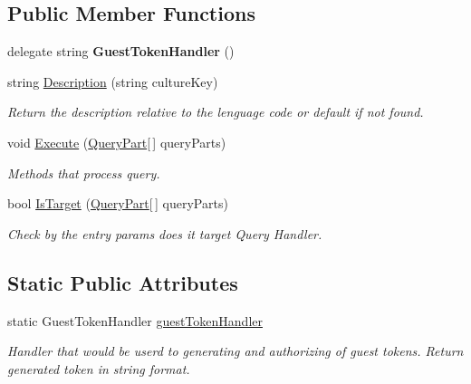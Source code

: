 \subsection*{Public Member Functions}
\begin{DoxyCompactItemize}
\item 
\mbox{\label{class_base_queries_1_1_g_e_t___g_u_e_s_t___t_o_k_e_n_a14602bc19c65ba7d11abf85e5e0f74a6}} 
delegate string {\bfseries Guest\+Token\+Handler} ()
\item 
string \mbox{\hyperlink{class_base_queries_1_1_g_e_t___g_u_e_s_t___t_o_k_e_n_a06d62fabd5b44fb6b9975da1b72308a2}{Description}} (string culture\+Key)
\begin{DoxyCompactList}\small\item\em Return the description relative to the lenguage code or default if not found. \end{DoxyCompactList}\item 
void \mbox{\hyperlink{class_base_queries_1_1_g_e_t___g_u_e_s_t___t_o_k_e_n_afbad0ace27a743793bccea51a5c39db5}{Execute}} (\mbox{\hyperlink{struct_uniform_queries_1_1_query_part}{Query\+Part}}\mbox{[}$\,$\mbox{]} query\+Parts)
\begin{DoxyCompactList}\small\item\em Methods that process query. \end{DoxyCompactList}\item 
bool \mbox{\hyperlink{class_base_queries_1_1_g_e_t___g_u_e_s_t___t_o_k_e_n_adb9e113e010750eeedd261ce6811da1c}{Is\+Target}} (\mbox{\hyperlink{struct_uniform_queries_1_1_query_part}{Query\+Part}}\mbox{[}$\,$\mbox{]} query\+Parts)
\begin{DoxyCompactList}\small\item\em Check by the entry params does it target Query Handler. \end{DoxyCompactList}\end{DoxyCompactItemize}
\subsection*{Static Public Attributes}
\begin{DoxyCompactItemize}
\item 
static Guest\+Token\+Handler \mbox{\hyperlink{class_base_queries_1_1_g_e_t___g_u_e_s_t___t_o_k_e_n_abf7dded72bc2a686ab8e179a413efaae}{guest\+Token\+Handler}}
\begin{DoxyCompactList}\small\item\em Handler that would be userd to generating and authorizing of guest tokens. Return generated token in string format. \end{DoxyCompactList}\end{DoxyCompactItemize}


